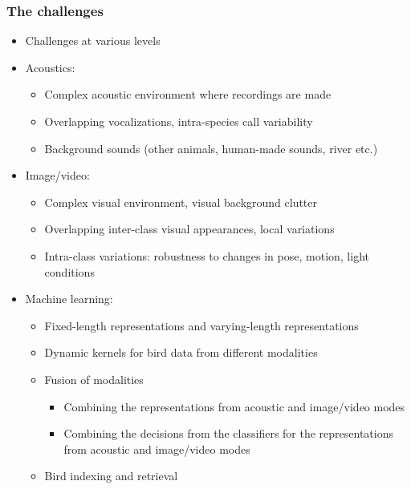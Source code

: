 \documentclass[mathserif]{beamer}
\begin{document}
\begin{frame}
\frametitle{The challenges}
\begin{itemize}
\item<2-> Challenges at various levels
\item<3-> Acoustics:
	\begin{itemize}
	\item<4-> Complex acoustic environment where recordings are made
	\item<5-> Overlapping vocalizations, intra-species call variability
	\item<6-> Background sounds (other animals, human-made sounds, river etc.)
	\end{itemize}
\item<7-> Image/video: 
	\begin{itemize}
	\item<8-> Complex visual environment, visual background clutter
	\item<9-> Overlapping inter-class visual appearances, local variations  
	\item<10-> Intra-class variations: robustness to changes in pose, motion, light conditions
	\end{itemize}
\item<11-> Machine learning:
	\begin{itemize}
	\item<12-> Fixed-length representations and varying-length representations
	\item<13-> Dynamic kernels for bird data from different modalities
	\item<14-> Fusion of modalities
	\begin{itemize}
	    \item<15-> Combining the representations from acoustic and image/video modes
	    \item<16-> Combining the decisions from the classifiers for the representations from acoustic and image/video modes
	\end{itemize}
	\item<17-> Bird indexing and retrieval
	\end{itemize}
\end{itemize}
\end{frame}
\end{document}
